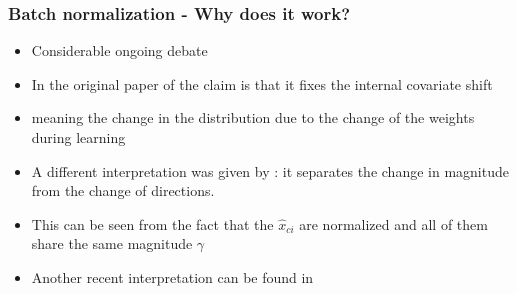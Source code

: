 \documentclass{beamer}
\begin{document}
\begin{frame}
    \frametitle{Batch normalization - Why does it work?}
\begin{itemize}
    \item Considerable ongoing debate
\item In the original paper of \cite{ioffe15} the claim is that it fixes the internal covariate shift 
\item meaning the change in the distribution due to the change of the weights during learning 
\item A different interpretation was given by \cite{kohler2019}: it separates the change in magnitude from the change of directions.
\item This can be seen from the fact that the $\hat{x}_{ci}$ are normalized and all of them share the same magnitude $\gamma$
\item Another recent interpretation can be found in \cite{chai2020}
\end{itemize}
\end{frame}
\end{document}
